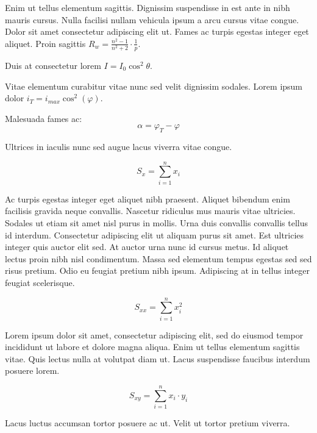 \documentclass{article}
\begin{document}
Enim ut tellus elementum sagittis. Dignissim suspendisse in est ante in nibh mauris cursus. Nulla facilisi nullam vehicula ipsum a arcu cursus vitae congue. Dolor sit amet consectetur adipiscing elit ut. Fames ac turpis egestas integer eget aliquet. Proin sagittis \begin{math}
	R_w=\frac{n^2-1}{n^2+2} \cdot \frac{1}{p}
\end{math}.\newline

Duis at consectetur lorem $ I=I_0\cos ^2\theta $.\newline

Vitae elementum curabitur vitae nunc sed velit dignissim sodales. Lorem ipsum dolor \( i_T=i_{max}\cos ^2(\varphi) \).\newline

Malesuada fames ac: \[ \alpha=\varphi_T-\varphi \]

Ultrices in iaculis nunc sed augue lacus viverra vitae congue.

$$ S_x=\sum_{i=1}^{n}x_i $$

Ac turpis egestas integer eget aliquet nibh praesent. Aliquet bibendum enim facilisis gravida neque convallis. Nascetur ridiculus mus mauris vitae ultricies. Sodales ut etiam sit amet nisl purus in mollis. Urna duis convallis convallis tellus id interdum. Consectetur adipiscing elit ut aliquam purus sit amet. Est ultricies integer quis auctor elit sed. At auctor urna nunc id cursus metus. Id aliquet lectus proin nibh nisl condimentum. Massa sed elementum tempus egestas sed sed risus pretium. Odio eu feugiat pretium nibh ipsum. Adipiscing at in tellus integer feugiat scelerisque.

\begin{displaymath}
	S_{xx}=\sum_{i=1}^{n}x_i^2
\end{displaymath}

Lorem ipsum dolor sit amet, consectetur adipiscing elit, sed do eiusmod tempor incididunt ut labore et dolore magna aliqua. Enim ut tellus elementum sagittis vitae. Quis lectus nulla at volutpat diam ut. Lacus suspendisse faucibus interdum posuere lorem. 

\begin{equation}
	S_{xy}=\sum_{i=1}^{n}x_i\cdot y_i
\end{equation}

Lacus luctus accumsan tortor posuere ac ut. Velit ut tortor pretium viverra.
\end{document}
